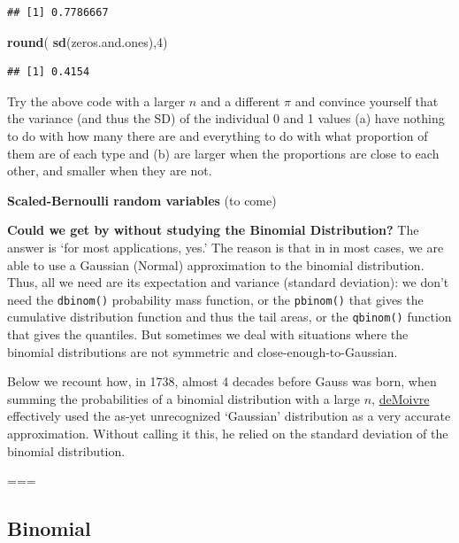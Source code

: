 \documentclass[]{book}
\newenvironment{Shaded}{\begin{snugshade}}{\end{snugshade}}
\newcommand{\DecValTok}[1]{\textcolor[rgb]{0.00,0.00,0.81}{#1}}
\newcommand{\KeywordTok}[1]{\textcolor[rgb]{0.13,0.29,0.53}{\textbf{#1}}}
\newcommand{\NormalTok}[1]{#1}
\begin{document}
\begin{verbatim}
## [1] 0.7786667
\end{verbatim}

\begin{Shaded}
\begin{Highlighting}[]
\KeywordTok{round}\NormalTok{( }\KeywordTok{sd}\NormalTok{(zeros.and.ones),}\DecValTok{4}\NormalTok{)}
\end{Highlighting}
\end{Shaded}

\begin{verbatim}
## [1] 0.4154
\end{verbatim}

Try the above code with a larger \(n\) and a different \(\pi\) and convince yourself that the variance (and thus the SD) of the individual 0 and 1 values (a) have nothing to do with how many there are and everything to do with what proportion of them are of each type and (b) are larger when the proportions are close to each other, and smaller when they are not.

\textbf{Scaled-Bernoulli random variables} (to come)

\textbf{Could we get by without studying the Binomial Distribution?} The answer is `for most applications, yes.' The reason is that in in most cases, we are able to use a Gaussian (Normal) approximation to the binomial distribution. Thus, all we need are its expectation and variance (standard deviation): we don't need the \texttt{dbinom()} probability mass function, or the \texttt{pbinom()} that gives the cumulative distribution function and thus the tail areas, or the \texttt{qbinom()} function that gives the quantiles. But sometimes we deal with situations where the binomial distributions are not symmetric and close-enough-to-Gaussian.

Below we recount how, in 1738, almost 4 decades before Gauss was born, when summing the probabilities of a binomial distribution with a large \(n\), \href{https://en.wikipedia.org/wiki/De_Moivre–Laplace_theorem}{deMoivre} effectively used the as-yet unrecognized `Gaussian' distribution as a very accurate approximation. Without calling it this, he relied on the standard deviation of the binomial distribution.

===

\hypertarget{binomial}{%
\subsection{Binomial}\label{binomial}}
\end{document}
